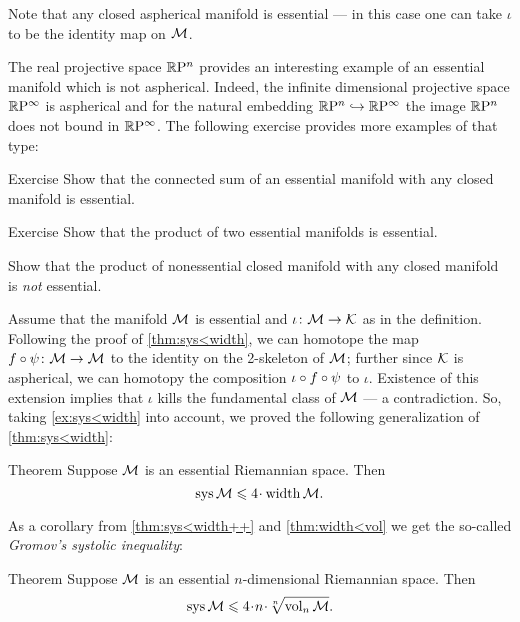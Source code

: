 Note that any closed aspherical manifold is essential --- in this case one can take $\iota$ to be the identity map on $\mathcal{M}$.

The real projective space $\mathbb{R}\mathrm{P}^n$ provides an interesting example of an essential manifold which is not aspherical.
Indeed, the infinite dimensional projective space $\mathbb{R}\mathrm{P}^\infty$ is aspherical and for the natural embedding $\mathbb{R}\mathrm{P}^n\hookrightarrow\mathbb{R}\mathrm{P}^\infty$ the image $\mathbb{R}\mathrm{P}^n$ does not bound in $\mathbb{R}\mathrm{P}^\infty$.
The following exercise provides more examples of that type:

\begin{thm}{Exercise}\label{ex:connected-sum-essential}
Show that the connected sum of an essential manifold with any closed manifold is essential.
\end{thm}

\begin{thm}{Exercise}\label{ex:product-essential}
Show that the product of two essential manifolds is essential.

Show that the product of nonessential closed manifold with any closed manifold is \emph{not} essential.
\end{thm}

Assume that the manifold $\mathcal{M}$ is essential and $\iota \colon\mathcal{M}\to \mathcal{K}$ as in the definition.
Following the proof of \ref{thm:sys<width}, we can homotope the map 
$f\circ\psi\colon\mathcal{M}\to \mathcal{M}$ to the identity on the 2-skeleton of $\mathcal{M}$;
further since $\mathcal{K}$ is aspherical, we can homotopy the composition
$\iota\z\circ f\circ\psi$ to  $\iota$. 
Existence of this extension implies that $\iota$ kills the fundamental class of $\mathcal{M}$ --- a contradiction.
So, taking \ref{ex:sys<width} into account, we proved the following generalization of \ref{thm:sys<width}:

\begin{thm}{Theorem}\label{thm:sys<width++}
Suppose $\mathcal{M}$ is an essential Riemannian space.
Then 
\[\sys\spc{M}\le 4 \cdot \width \spc{M}.\]
\end{thm}

As a corollary from \ref{thm:sys<width++} and \ref{thm:width<vol} we get the so-called \emph{Gromov's systolic inequality}:

\begin{thm}{Theorem}\label{thm:sys+}
Suppose $\mathcal{M}$ is an essential $n$-dimensional Riemannian space.
Then 
\[\sys\spc{M}\le 4 \cdot n\cdot \sqrt[n]{\vol_n\spc{M}}.\]
\end{thm}


